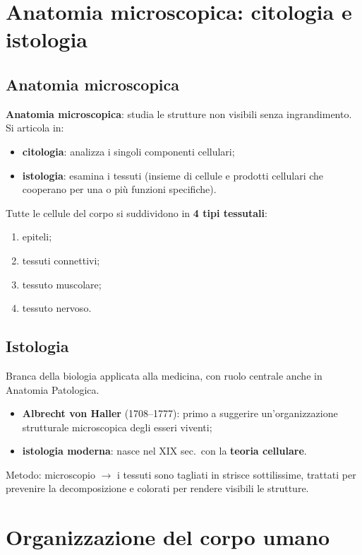 \section{Anatomia microscopica: citologia e istologia}

\subsection{Anatomia microscopica}
\textbf{Anatomia microscopica}: studia le strutture non visibili senza ingrandimento. Si articola in:
\begin{itemize}
  \item \textbf{citologia}: analizza i singoli componenti cellulari;
  \item \textbf{istologia}: esamina i tessuti (insieme di cellule e prodotti cellulari che
    cooperano per una o più funzioni specifiche).
\end{itemize}
Tutte le cellule del corpo si suddividono in \textbf{4 tipi tessutali}:
\begin{enumerate}
  \item epiteli;
  \item tessuti connettivi;
  \item tessuto muscolare;
  \item tessuto nervoso.
\end{enumerate}

\subsection{Istologia}
Branca della biologia applicata alla medicina, con ruolo centrale anche in Anatomia Patologica.
\begin{itemize}
  \item \textbf{Albrecht von Haller} (1708--1777): primo a suggerire un'organizzazione strutturale
    microscopica degli esseri viventi;
  \item \textbf{istologia moderna}: nasce nel XIX sec.\ con la \textbf{teoria cellulare}.
\end{itemize}
Metodo: microscopio $\rightarrow$ i tessuti sono tagliati in strisce sottilissime, trattati per
prevenire la decomposizione e colorati per rendere visibili le strutture.

\section{Organizzazione del corpo umano}

